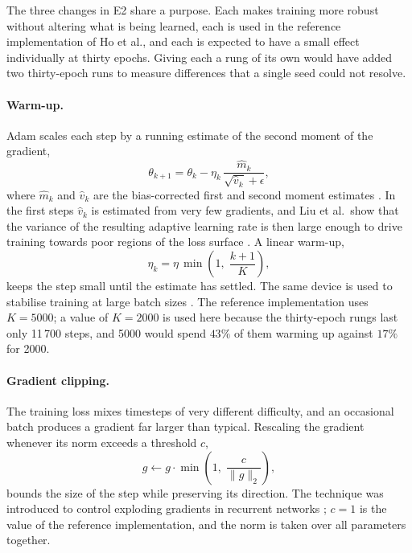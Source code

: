 The three changes in E2 share a purpose. Each makes training more robust without altering what is
being learned, each is used in the reference implementation of Ho et al., and each is expected to
have a small effect individually at thirty epochs. Giving each a rung of its own would have added two
thirty-epoch runs to measure differences that a single seed could not resolve.

\paragraph{Warm-up.} Adam scales each step by a running estimate of the second moment of the
gradient,
\begin{equation}
    \theta_{k+1} = \theta_k - \eta_k\,\frac{\hat m_k}{\sqrt{\hat v_k} + \epsilon},
    \label{eq:ext-adam}
\end{equation}
where $\hat m_k$ and $\hat v_k$ are the bias-corrected first and second moment estimates
\parencite{arXiv:1412.6980}. In the first steps $\hat v_k$ is estimated from very few gradients, and
Liu et al.\ show that the variance of the resulting adaptive learning rate is then large enough to
drive training towards poor regions of the loss surface \parencite{arXiv:1908.03265}. A linear warm-up,
\begin{equation}
    \eta_k = \eta\,\min\!\left(1,\; \frac{k+1}{K}\right),
    \label{eq:ext-warmup}
\end{equation}
keeps the step small until the estimate has settled. The same device is used to stabilise training
at large batch sizes \parencite{arXiv:1706.02677}. The reference implementation uses $K = 5000$; a
value of $K = 2000$ is used here because the thirty-epoch rungs last only 11\,700 steps, and 5000
would spend $43\%$ of them warming up against $17\%$ for 2000.

\paragraph{Gradient clipping.} The training loss mixes timesteps of very different difficulty, and
an occasional batch produces a gradient far larger than typical. Rescaling the gradient whenever its
norm exceeds a threshold $c$,
\begin{equation}
    g \leftarrow g \cdot \min\!\left(1,\; \frac{c}{\lVert g \rVert_2}\right),
    \label{eq:ext-clip}
\end{equation}
bounds the size of the step while preserving its direction. The technique was introduced to control
exploding gradients in recurrent networks \parencite{arXiv:1211.5063}; $c = 1$ is the value of the
reference implementation, and the norm is taken over all parameters together.


